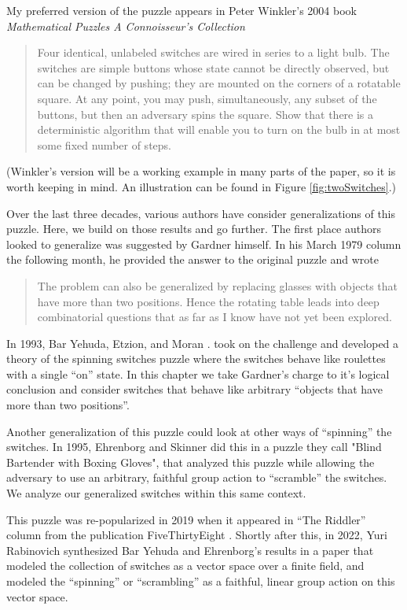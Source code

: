 My preferred version of the puzzle appears in Peter Winkler's 2004 book
\textit{Mathematical Puzzles A Connoisseur's Collection} \cite{Winkler2004}
\begin{quote}
  Four identical, unlabeled switches are wired in series to a light bulb.
  The switches are simple buttons whose state cannot be directly observed,
  but can be changed by pushing; they are mounted on the corners of a
  rotatable square. At any point, you may push, simultaneously, any subset
  of the buttons, but then an adversary spins the square. Show that there
  is a deterministic algorithm that will enable you to turn on the bulb in
  at most some fixed number of steps.
\end{quote}

(Winkler's version will be a working example in many parts of the paper, so it
is worth keeping in mind.
An illustration can be found in Figure \ref{fig:twoSwitches}.)

Over the last three decades, various authors have consider generalizations of
this puzzle. Here, we build on those results and go further.
The first place authors looked to generalize was suggested by Gardner himself.
In his March 1979 column the following month, he provided the answer to the
original puzzle and wrote
\begin{quote}
The problem can also be generalized by replacing glasses with objects that
have more than two positions. Hence the rotating table leads into deep
combinatorial questions that as far as I know have not yet been explored.
\cite{Gardner1979Solution}
\end{quote}

In 1993, Bar Yehuda, Etzion, and Moran \cite{BarYehuda1993}. took on the challenge and developed a theory
of the spinning switches puzzle where the switches behave like roulettes
with a single ``on'' state. In this chapter we take Gardner's charge to
it's logical conclusion and consider switches that behave like arbitrary
``objects that have more than two positions''.

Another generalization of this puzzle could look at other ways of ``spinning''
the switches. In 1995, Ehrenborg and Skinner \cite{Ehrenborg1995} did this
in a puzzle they call "Blind Bartender with Boxing Gloves", that analyzed
this puzzle while allowing the adversary to use an arbitrary, faithful group action
to ``scramble'' the switches. We analyze our generalized switches within this
same context.

This puzzle was re-popularized in 2019 when it appeared in ``The Riddler''
column from the publication FiveThirtyEight \cite{FiveThirtyEight}.
Shortly after this, in 2022, Yuri Rabinovich synthesized Bar Yehuda and Ehrenborg's
results in a paper that modeled the collection of switches as a vector space
over a finite field, and modeled the ``spinning'' or ``scrambling'' as a
faithful, linear group action on this vector space.

